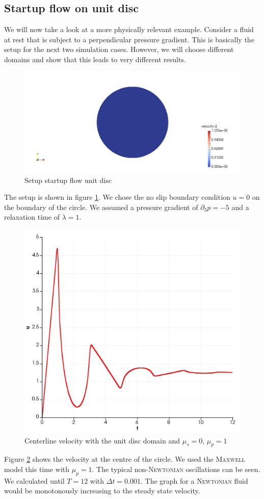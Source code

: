 \documentclass[12pt,a4paper,twoside, open=right]{scrreprt}
\theoremstyle{definition}
\theoremstyle{plain}
\begin{document}
\subsection{Startup flow on unit disc}
We will now take a look at a more physically relevant example. Consider a fluid at rest that is subject to a perpendicular pressure gradient. This is basically the setup for the next two simulation cases. However, we will choose different domains and show that this leads to very different results. 
\begin{figure}
    \centering
    \includegraphics[width=\textwidth]{UnitDiscSetup}
    \caption{Setup startup flow unit disc}
    \label{fig:unitdiscsetup}
\end{figure}
The setup is shown in figure \ref{fig:unitdiscsetup}. We chose the no slip boundary condition $u=0$ on the boundary of the circle. We assumed a pressure gradient of $\partial_3 p=-5$ and a relaxation time of $\lambda=1$. 
\begin{figure}
    \centering
    \includegraphics[width=\textwidth]{UnitDiscCenterline}
    \caption{Centerline velocity with the unit disc domain and $\mu_s=0$, $\mu_p=1$}
    \label{fig:unitdisccenterline}
\end{figure}
Figure \ref{fig:unitdisccenterline} shows the velocity at the centre of the circle. We used the \textsc{Maxwell} model this time with $\mu_p=1$. The typical non-\textsc{Newtonian} oscillations can be seen. We calculated until $T=12$ with $\Delta t=0.001$. The graph for a \textsc{Newtonian} fluid would be monotonously increasing to the steady state velocity.
\end{document}
